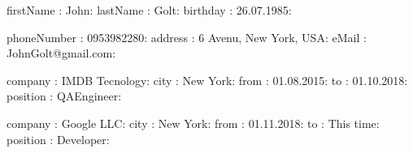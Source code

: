
firstName : John:
lastName : Golt:
birthday : 26.07.1985:


phoneNumber : 0953982280:
address : 6 Avenu, New York, USA:
eMail : JohnGolt@gmail.com:


company : IMDB Tecnology:
city : New York:
from : 01.08.2015:
to : 01.10.2018:
position : QAEngineer:

company : Google LLC:
city : New York:
from : 01.11.2018:
to  : This time:
position : Developer:


